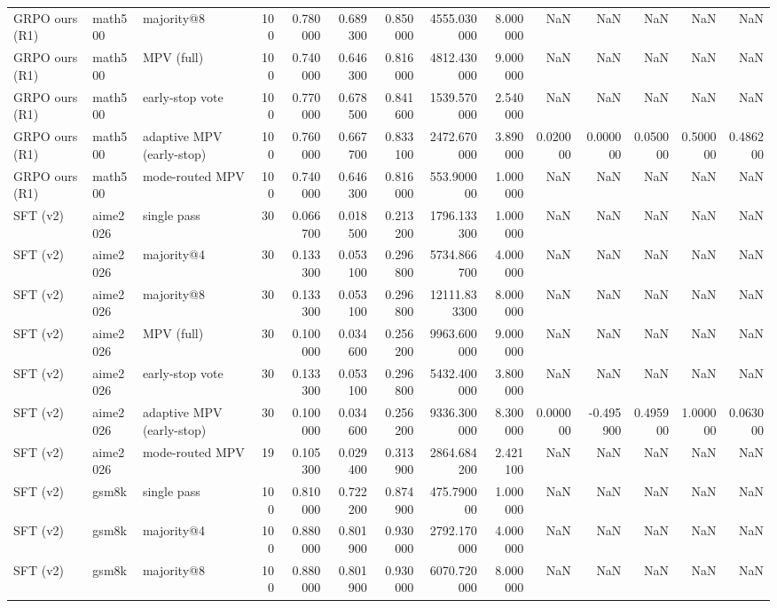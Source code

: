 \begin{table}
\begin{tabular}{lllrrrrrrrrrrr}
GRPO ours (R1) & math500 & majority@8 & 100 & 0.780000 & 0.689300 & 0.850000 & 4555.030000 & 8.000000 & NaN & NaN & NaN & NaN & NaN \\
GRPO ours (R1) & math500 & MPV (full) & 100 & 0.740000 & 0.646300 & 0.816000 & 4812.430000 & 9.000000 & NaN & NaN & NaN & NaN & NaN \\
GRPO ours (R1) & math500 & early-stop vote & 100 & 0.770000 & 0.678500 & 0.841600 & 1539.570000 & 2.540000 & NaN & NaN & NaN & NaN & NaN \\
GRPO ours (R1) & math500 & adaptive MPV (early-stop) & 100 & 0.760000 & 0.667700 & 0.833100 & 2472.670000 & 3.890000 & 0.020000 & 0.000000 & 0.050000 & 0.500000 & 0.486200 \\
GRPO ours (R1) & math500 & mode-routed MPV & 100 & 0.740000 & 0.646300 & 0.816000 & 553.900000 & 1.000000 & NaN & NaN & NaN & NaN & NaN \\
SFT (v2) & aime2026 & single pass & 30 & 0.066700 & 0.018500 & 0.213200 & 1796.133300 & 1.000000 & NaN & NaN & NaN & NaN & NaN \\
SFT (v2) & aime2026 & majority@4 & 30 & 0.133300 & 0.053100 & 0.296800 & 5734.866700 & 4.000000 & NaN & NaN & NaN & NaN & NaN \\
SFT (v2) & aime2026 & majority@8 & 30 & 0.133300 & 0.053100 & 0.296800 & 12111.833300 & 8.000000 & NaN & NaN & NaN & NaN & NaN \\
SFT (v2) & aime2026 & MPV (full) & 30 & 0.100000 & 0.034600 & 0.256200 & 9963.600000 & 9.000000 & NaN & NaN & NaN & NaN & NaN \\
SFT (v2) & aime2026 & early-stop vote & 30 & 0.133300 & 0.053100 & 0.296800 & 5432.400000 & 3.800000 & NaN & NaN & NaN & NaN & NaN \\
SFT (v2) & aime2026 & adaptive MPV (early-stop) & 30 & 0.100000 & 0.034600 & 0.256200 & 9336.300000 & 8.300000 & 0.000000 & -0.495900 & 0.495900 & 1.000000 & 0.063000 \\
SFT (v2) & aime2026 & mode-routed MPV & 19 & 0.105300 & 0.029400 & 0.313900 & 2864.684200 & 2.421100 & NaN & NaN & NaN & NaN & NaN \\
SFT (v2) & gsm8k & single pass & 100 & 0.810000 & 0.722200 & 0.874900 & 475.790000 & 1.000000 & NaN & NaN & NaN & NaN & NaN \\
SFT (v2) & gsm8k & majority@4 & 100 & 0.880000 & 0.801900 & 0.930000 & 2792.170000 & 4.000000 & NaN & NaN & NaN & NaN & NaN \\
SFT (v2) & gsm8k & majority@8 & 100 & 0.880000 & 0.801900 & 0.930000 & 6070.720000 & 8.000000 & NaN & NaN & NaN & NaN & NaN \\

\end{tabular}
\end{table}
